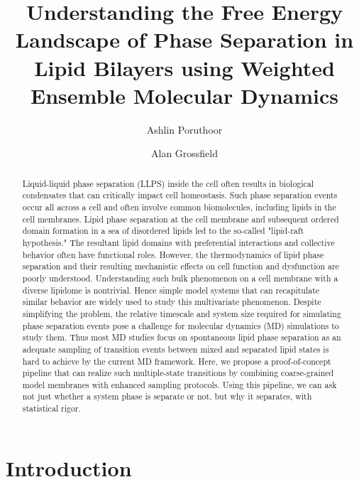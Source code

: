 \documentclass{biophys-new}
\title{Understanding the Free Energy Landscape of Phase Separation in Lipid Bilayers using Weighted Ensemble Molecular Dynamics}
\author[1]{Ashlin Poruthoor}
\author[1,*]{Alan Grossfield}
\affil[1]{University of Rochester Medical Center, Rochester, NY 14620}
\begin{document}
\begin{frontmatter}
\begin{abstract}

Liquid-liquid phase separation (LLPS) inside the cell often results in biological condensates that can critically impact
cell homeostasis. Such phase separation events occur all across a cell and often involve common biomolecules, including
lipids in the cell membranes. Lipid phase separation at the cell membrane and subsequent ordered domain formation in a sea
of disordered lipids led to the so-called "lipid-raft hypothesis." The resultant lipid domains with preferential interactions and
collective behavior often have functional roles. However, the thermodynamics of lipid phase separation and their resulting
mechanistic effects on cell function and dysfunction are poorly understood. Understanding such bulk phenomenon on a cell
membrane with a diverse lipidome is nontrivial. Hence simple model systems that can recapitulate similar behavior are
widely used to study this multivariate phenomenon. Despite simplifying the problem, the relative timescale and system size
required for simulating phase separation events pose a challenge for molecular dynamics (MD) simulations to study them.
Thus most MD studies focus on spontaneous lipid phase separation as an adequate sampling of transition events between
mixed and separated lipid states is hard to achieve by the current MD framework. Here, we propose a proof-of-concept pipeline that can realize such multiple-state transitions by combining coarse-grained model membranes with enhanced sampling protocols.
Using this pipeline, we can ask not just whether a system phase is separate or not, but why it separates, with statistical rigor.

\end{abstract}

\end{frontmatter}

\section*{Introduction}
\end{document}
